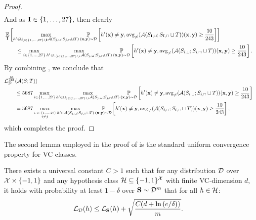\begin{proof}
\begin{align}
\end{align}
And as $\mathbf{I}\in\{1,\ldots,27  \}$, then clearly
\begin{align}\label{eq:relationerror3}
& \operatorname*{\mathbb{E}}_{\mathbf{I}}\left[\max_{h'\in  \sqcup_{j\in \{1,\ldots,27  \} \backslash \mathbf{I}}\mathcal{A}(S_{j,\sqcup}; S_{j,\sqcap} \sqcup T) }\operatorname*{\mathbb{P}}_{(\mathbf{x},\mathbf{y})\sim\mathcal{D}}\left[h'(\mathbf{x})\not=\mathbf{y},\operatorname{\mathrm{avg}_{\not=}}(\mathcal{A}(S_{\mathbf{I},\sqcup}; S_{\mathbf{I},\sqcap}\sqcup T))(\mathbf{x},\mathbf{y}) \geq \frac{10}{243}  \right]\right] \nonumber
\\
&\qquad \leq\max_{i\in\{1,\ldots,27  \} } \max_{h'\in  \sqcup_{j\in \{1,\ldots,27  \} \backslash i}\mathcal{A}(S_{j,\sqcup}; S_{j,\sqcap} \sqcup T) }\operatorname*{\mathbb{P}}_{(\mathbf{x},\mathbf{y})\sim\mathcal{D}}\left[h'(\mathbf{x})\not=\mathbf{y},\operatorname{\mathrm{avg}_{\not=}}(\mathcal{A}(S_{i,\sqcup}; S_{i,\sqcap}\sqcup T))(\mathbf{x},\mathbf{y}) \geq \frac{10}{243}\right]. 
\end{align} 
By combining , we conclude that
\begin{align*}
    \operatorname{\mathcal{L}}_{\mathcal{D}}^{\frac{10}{243}} &(\mathcal{A}(S;T))
    \\
    &\leq 5687\max_{i\in\{1,\ldots,27  \} } \max_{h'\in  \sqcup_{j\in \{1,\ldots,27  \} \backslash i}\mathcal{A}(S_{j,\sqcup}; S_{j,\sqcap} \sqcup T) }\operatorname*{\mathbb{P}}_{(\mathbf{x},\mathbf{y})\sim\mathcal{D}}\left[h'(\mathbf{x})\not=\mathbf{y},\operatorname{\mathrm{avg}_{\not=}}(\mathcal{A}(S_{i,\sqcup}; S_{i,\sqcap}\sqcup T))(\mathbf{x},\mathbf{y}) \geq \frac{10}{243} \right] \nonumber
    \\
    &=5687 \max_{\stackrel{i,j\in \{1,\ldots,27  \}}{i\not=j} }\max_{h'\in \mathcal{A}(S_{j,\sqcup};S_{j,\sqcap}\sqcup T)}\operatorname*{\mathbb{P}}_{(\mathbf{x},\mathbf{y})\sim\mathcal{D}}\left[h'(\mathbf{x})\not=\mathbf{y},\operatorname{\mathrm{avg}_{\not=}}(\mathcal{A}(S_{i,\sqcup}; S_{i,\sqcap}\sqcup T))(\mathbf{x},\mathbf{y}) \geq \frac{10}{243}\right], 
\end{align*}
which completes the proof.
\end{proof}

The second lemma employed in the proof of  is the standard uniform convergence property for VC classes. 

\begin{lemma}\label{lem:fundamentalheoremoflearning}
There exists a universal constant $ C>1 $ such that for any distribution $ \mathcal{D}  $ over $ \mathcal{X}\times \left\{  -1,1\right\}  $ and any hypothesis class $ \mathcal{H} \subseteq \{  -1,1\}^{\mathcal{X}} $ with finite VC-dimension $ d $, it holds with probability at least $ 1-\delta $ over $ \mathbf{S}\sim \mathcal{D}^m$ that for all $ h\in \mathcal{H} $:  
\begin{align*}
 \operatorname{\mathcal{L}}_{\mathcal{D}}(h)\leq \operatorname{\mathcal{L}}_{\mathbf{S}}(h)+\sqrt{\frac{C(d+\ln{\left(e/\delta \right)})}{m}}.
\end{align*}    
\end{lemma}

